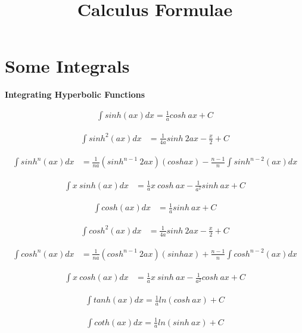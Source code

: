 \documentclass{article}
\title{Calculus Formulae}
\begin{document}
\maketitle

\section{Some Integrals}

\Large \textbf{Integrating Hyperbolic Functions}

\begin{align*}
    \int sinh(ax) dx = \frac{1}{a} cosh \ ax + C
\end{align*}

\begin{align*}
    \int sinh^2(ax) dx &= \frac{1}{4a} sinh \ 2ax - \frac{x}{2} + C
\end{align*}

\begin{align*}
    \int sinh^n(ax) dx &= \frac{1}{na} (sinh^{n-1} \ 2ax)(cosh ax) - \frac{n-1}{n} \int sinh^{n-2}(ax) dx
\end{align*}

\begin{align*}
    \int x \ sinh(ax) dx &= \frac{1}{a} x \ cosh \ ax - \frac{1}{a^2} sinh \ ax + C
\end{align*}

\begin{align*}
    \int cosh(ax) dx &= \frac{1}{a}sinh \ ax + C
\end{align*}

\begin{align*}
    \int cosh^2(ax) dx &= \frac{1}{4a} sinh \ 2ax - \frac{x}{2} + C
\end{align*}

\begin{align*}
    \int cosh^n(ax) dx &= \frac{1}{na} (cosh^{n-1} \ 2ax)(sinh ax) + \frac{n-1}{n} \int cosh^{n-2}(ax) dx
\end{align*}

\begin{align*}
    \int x \ cosh(ax) dx &= \frac{1}{a} x \ sinh \ ax - \frac{1}{a^2} cosh \ ax + C
\end{align*}

\begin{align*}
    \int tanh(ax) dx = \frac{1}{a} ln(cosh \ ax) + C
\end{align*}

\begin{align*}
    \int coth(ax) dx = \frac{1}{a} ln(sinh \ ax) + C
\end{align*}
\newline
\end{document}
